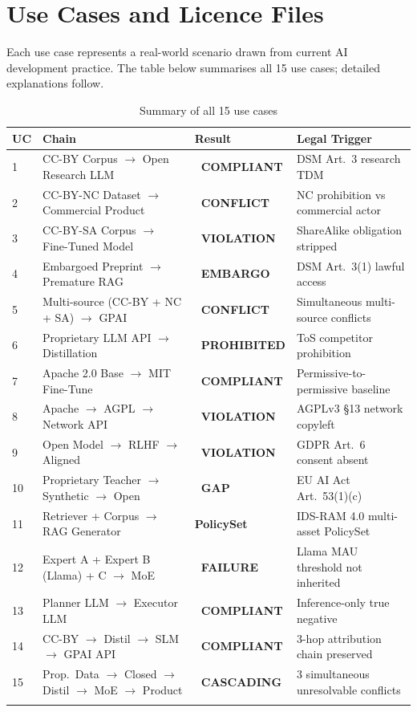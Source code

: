 \documentclass[12pt,a4paper]{article}
\newcommand{\compliant}{\textcolor{compliant}{\textbf{\checkmark\ COMPLIANT}}}
\newcommand{\violated}[1]{\textcolor{violation}{\textbf{\texttimes\ #1}}}
\newcommand{\policyset}{\textbf{PolicySet}}
\begin{document}
\newpage

\section{Use Cases and Licence Files}

Each use case represents a real-world scenario drawn from current AI development practice. The table below summarises all 15 use cases; detailed explanations follow.

\begin{longtable}{@{}p{0.7cm}p{5.0cm}p{2.0cm}p{6.0cm}@{}}
\toprule
\textbf{UC} & \textbf{Chain} & \textbf{Result} & \textbf{Legal Trigger} \\
\midrule
\endhead
1 & CC-BY Corpus $\rightarrow$ Open Research LLM & \compliant & DSM Art.\ 3 research TDM \\
2 & CC-BY-NC Dataset $\rightarrow$ Commercial Product & \violated{CONFLICT} & NC prohibition vs commercial actor \\
3 & CC-BY-SA Corpus $\rightarrow$ Fine-Tuned Model & \violated{VIOLATION} & ShareAlike obligation stripped \\
4 & Embargoed Preprint $\rightarrow$ Premature RAG & \violated{EMBARGO} & DSM Art.\ 3(1) lawful access \\
5 & Multi-source (CC-BY + NC + SA) $\rightarrow$ GPAI & \violated{CONFLICT} & Simultaneous multi-source conflicts \\
6 & Proprietary LLM API $\rightarrow$ Distillation & \violated{PROHIBITED} & ToS competitor prohibition \\
7 & Apache 2.0 Base $\rightarrow$ MIT Fine-Tune & \compliant & Permissive-to-permissive baseline \\
8 & Apache $\rightarrow$ AGPL $\rightarrow$ Network API & \violated{VIOLATION} & AGPLv3 \S 13 network copyleft \\
9 & Open Model $\rightarrow$ RLHF $\rightarrow$ Aligned & \violated{VIOLATION} & GDPR Art.\ 6 consent absent \\
10 & Proprietary Teacher $\rightarrow$ Synthetic $\rightarrow$ Open & \violated{GAP} & EU AI Act Art.\ 53(1)(c) \\
11 & Retriever + Corpus $\rightarrow$ RAG Generator & \policyset & IDS-RAM 4.0 multi-asset PolicySet \\
12 & Expert A + Expert B (Llama) + C $\rightarrow$ MoE & \violated{FAILURE} & Llama MAU threshold not inherited \\
13 & Planner LLM $\rightarrow$ Executor LLM & \compliant & Inference-only true negative \\
14 & CC-BY $\rightarrow$ Distil $\rightarrow$ SLM $\rightarrow$ GPAI API & \compliant & 3-hop attribution chain preserved \\
15 & Prop.\ Data $\rightarrow$ Closed $\rightarrow$ Distil $\rightarrow$ MoE $\rightarrow$ Product & \violated{CASCADING} & 3 simultaneous unresolvable conflicts \\
\bottomrule
\caption{Summary of all 15 use cases}
\end{longtable}
\end{document}

